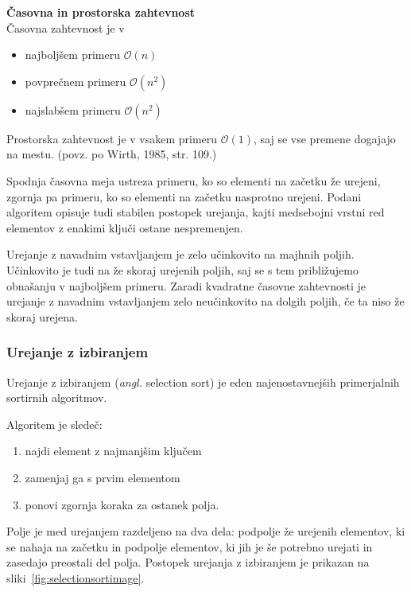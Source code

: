 \documentclass[a4paper,oneside,12pt]{article}
\newcommand{\subsubsubsection}[1]{\vspace*{1ex}\textbf{#1}\\}
\begin{document}
\subsubsubsection{Časovna in prostorska zahtevnost} \nopagebreak
Časovna zahtevnost je v 
\begin{itemize}
  \item najboljšem primeru $\mathcal{O}(n)$
  \item povprečnem primeru $\mathcal{O}(n^2)$
  \item najslabšem primeru $\mathcal{O}(n^2)$
\end{itemize}

Prostorska zahtevnost je v vsakem primeru $\mathcal{O}(1)$, saj se vse premene dogajajo na
mestu.
(povz. po Wirth, 1985, str. 109.)

Spodnja časovna meja ustreza primeru, ko so elementi na začetku že urejeni, zgornja pa primeru,
ko so elementi na začetku nasprotno urejeni. Podani algoritem opisuje tudi stabilen postopek urejanja, kajti medsebojni
vrstni red elementov z enakimi ključi ostane nespremenjen.

Urejanje z navadnim vstavljanjem je zelo učinkovito na majhnih poljih. Učinkovito je tudi na že
skoraj urejenih poljih, saj se s tem približujemo obnašanju v najboljšem primeru.
Zaradi kvadratne časovne zahtevnosti je urejanje z navadnim vstavljanjem zelo neučinkovito na
dolgih poljih, če ta niso že skoraj urejena.

\subsubsection{Urejanje z izbiranjem}
\label{chapter:selectionsort}
Urejanje z izbiranjem (\emph{angl.} selection sort) je eden najenostavnejših primerjalnih sortirnih
algoritmov.

Algoritem je sledeč:\vspace{-1ex}
\begin{enumerate}\addtolength{\itemsep}{-0.65\baselineskip}
  \item najdi element z najmanjšim ključem
  \item zamenjaj ga s prvim elementom
  \item ponovi zgornja koraka za ostanek polja.
\end{enumerate}

Polje je med urejanjem razdeljeno na dva dela: podpolje že urejenih elementov, ki se
nahaja na začetku in podpolje elementov, ki jih je še potrebno urejati in zasedajo
preostali del polja. Postopek urejanja z izbiranjem je prikazan na
sliki~\ref{fig:selectionsortimage}. \\
\end{document}
